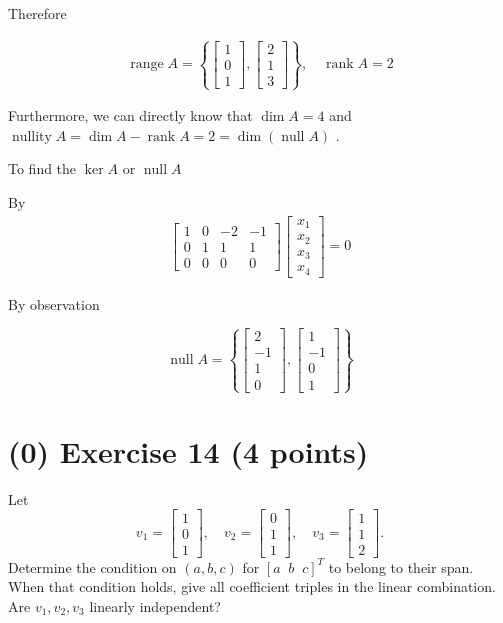\documentclass[12pt,a4paper]{article}
\begin{document}
Therefore

\begin{align*}
	\operatorname{range}A = \left\{	\begin{bmatrix}
		1 \\ 0 \\ 1
	\end{bmatrix},\begin{bmatrix}
	2 \\ 1 \\ 3
	\end{bmatrix}\right\}, \quad \operatorname{rank}A = 2
\end{align*}

Furthermore, we can directly know that $\dim A = 4$ and $\operatorname{nullity}A = \dim A - \operatorname{rank} A = 2 = \dim (\operatorname{null}A)$ .

To find the $\ker A$ or $\operatorname{null}A$

By 
\begin{align*}
	\begin{bmatrix}
		1 & 0 & -2 & -1 \\
		0 & 1 & 1 & 1 \\
		0 & 0 & 0 & 0
	\end{bmatrix}\begin{bmatrix}
	x_1 \\ x_2 \\ x_3 \\ x_4 
	\end{bmatrix} = 0
\end{align*}

By observation

\[
\operatorname{null} A = \left\{ \begin{bmatrix}
	2 \\ -1 \\ 1 \\ 0
\end{bmatrix}, \begin{bmatrix}
	1 \\ -1 \\ 0 \\ 1
\end{bmatrix} \right\}
\]

\vspace{3cm}
\vfill
\section*{(0) Exercise 14 \hfill {\normalsize (4 points)}}
Let
\[
v_1=\begin{bmatrix}1\\0\\1\end{bmatrix},\quad
v_2=\begin{bmatrix}0\\1\\1\end{bmatrix},\quad
v_3=\begin{bmatrix}1\\1\\2\end{bmatrix}.
\]
Determine the condition on $(a,b,c)$ for $[a\;\;b\;\;c]^T$ to belong to their span. When that condition holds, give all coefficient triples in the linear combination. Are $v_1,v_2,v_3$ linearly independent?
\end{document}
